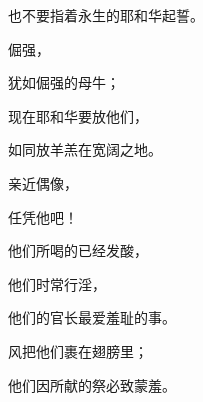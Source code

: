 {\par }{\Q 也不要指着永生的耶和华起誓。
\par }{\Q {}倔强，
\par }{\Q 犹如倔强的母牛；
\par }{\Q 现在耶和华要放他们，
\par }{\Q 如同放羊羔在宽阔之地。
\par }{\BB \par }{\Q {}亲近偶像，
\par }{\Q 任凭他吧！
\par }{\Q {}他们所喝的已经发酸，
\par }{\Q 他们时常行淫，
\par }{\Q 他们的官长最爱羞耻的事。
\par }{\Q {}风把他们裹在翅膀里；
\par }{\Q 他们因所献的祭必致蒙羞。

}
